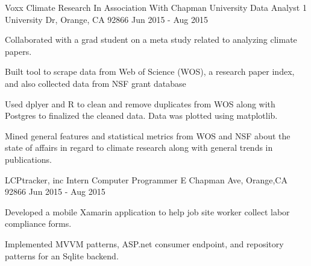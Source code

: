 \begin{cventries}
  \cventry
    {Voxx Climate Research In Association With Chapman University} %
    {Data Analyst} %
    {1 University Dr, Orange, CA 92866} %
    { Jun 2015 - Aug 2015} %
    {
      \begin{cvitems} %
        \item {Collaborated with a grad student on a meta study related to analyzing climate papers.}
        \item {Built tool to scrape data from Web of Science (WOS), a research paper index, and also collected data from NSF grant database}
        \item {Used dplyer and R to clean and remove duplicates from WOS along with Postgres to finalized the cleaned data. Data was plotted using matplotlib.}
        \item {Mined general features and statistical metrics from WOS and NSF about the state of affairs in regard to climate research along with general trends in publications.}
      \end{cvitems}
    }
  \cventry
    {LCPtracker, inc} %
    {Intern Computer Programmer} %
    {E Chapman Ave, Orange,CA 92866} %
    {Jun 2015 - Aug 2015} %
    {
      \begin{cvitems} %
        \item{Developed a mobile Xamarin application to help job site worker collect labor compliance forms.}
        \item{Implemented MVVM patterns, ASP.net consumer endpoint, and repository patterns for an Sqlite backend.}
      \end{cvitems}
    }
    

\end{cventries}
